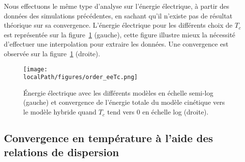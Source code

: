 Nous effectuons le même type d'analyse sur l'énergie électrique, à partir des données des simulations précédentes, en sachant qu'il n'existe pas de résultat théorique sur sa convergence. L'énergie électrique pour les différents choix de $T_c$ est représentée sur la figure~\ref{fig:limit:ee} (gauche), cette figure illustre mieux la nécessité d'effectuer une interpolation pour extraire les données. Une convergence est observée sur la figure~\ref{fig:limit:ee} (droite).
\begin{figure}[h]
  \centering
  \texttt{[image: \\localPath/figures/order\_eeTc.png]}
  \caption{Énergie électrique avec les différents modèles en échelle semi-log (gauche) et convergence de l'énergie totale du modèle cinétique vers le modèle hybride quand $T_c$ tend vers $0$ en échelle log (droite).}
  \label{fig:limit:ee}
\end{figure}

\FloatBarrier


\subsection{Convergence en température à l'aide des relations de dispersion}

